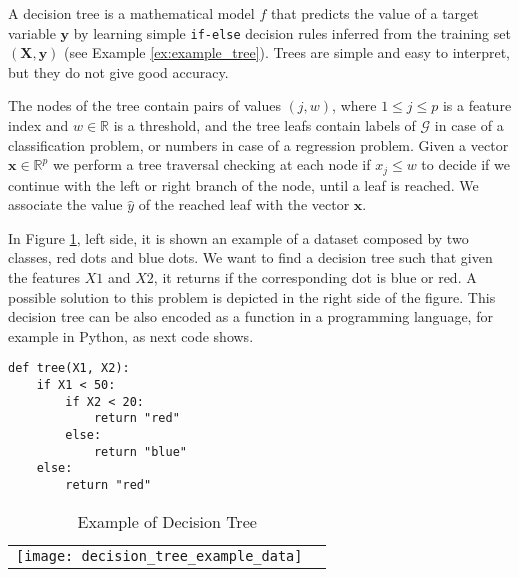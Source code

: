 A decision tree is a mathematical model $f$ that predicts the value of a target variable $\mathbf{y}$ by learning simple \texttt{if-else} decision rules inferred from the training set $(\mathbf{X}, \mathbf{y})$ (see Example \ref{ex:example_tree}). Trees are simple and easy to interpret, but they do not give good accuracy.


The nodes of the tree contain pairs of values $(j, w)$, where $1 \leq j \leq p$ is a feature index and $w \in \mathbb{R}$ is a threshold, and the tree leafs contain labels of $\mathcal{G}$ in case of a classification problem, or numbers in case of a regression problem. Given a vector $\textbf{x} \in \mathbb{R}^p$ we perform a tree traversal checking at each node if $x_j \leq w$ to decide if we continue with the left or right branch of the node, until a leaf is reached. We associate the value $\hat{y}$ of the reached leaf with the vector $\textbf{x}$.

\begin{example}
    \label{ex:example_tree}
    In Figure \ref{tab:DecisionTreeExample}, left side, it is shown an example of a dataset composed by two classes, red dots and blue dots. We want to find a decision tree such that given the features $X1$ and $X2$, it returns if the corresponding dot is blue or red. A possible solution to this problem is depicted in the right side of the figure. This decision tree can be also encoded as a function in a programming language, for example in Python, as next code shows.

    \begin{sourcecode}
        {\scriptsize \begin{verbatim}
def tree(X1, X2):
    if X1 < 50:
        if X2 < 20:
            return "red"
        else:
            return "blue"
    else:
        return "red"
\end{verbatim}}
    \end{sourcecode}

\end{example}

\begin{table}
    \begin{center}

        \begin{tabular}{ c c }

            \texttt{[image: decision\_tree\_example\_data]} & \raisebox{.4\height}{\texttt{[image: decision\_tree\_example]}}
        \end{tabular}
    \end{center}
    \caption{\label{tab:DecisionTreeExample}Example of Decision Tree}
\end{table}

